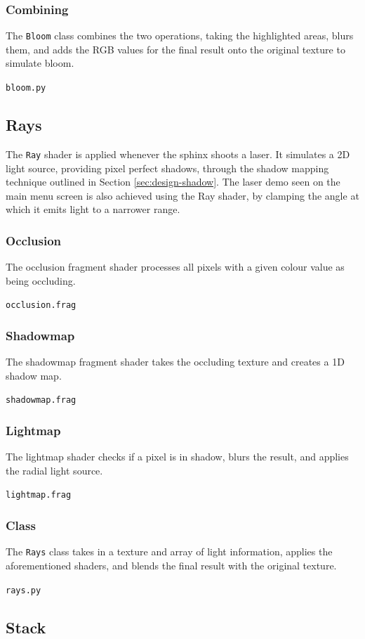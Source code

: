 \documentclass[../main/main.tex]{subfiles}
\begin{document}
\subsubsection*{Combining}
The \lstinline{Bloom} class combines the two operations, taking the highlighted areas, blurs them, and adds the RGB values for the final result onto the original texture to simulate bloom.

\noindent\verb|bloom.py|


\subsection{Rays}
\label{sec:shader-rays}
The \lstinline{Ray} shader is applied whenever the sphinx shoots a laser. It simulates a 2D light source, providing pixel perfect shadows, through the shadow mapping technique outlined in Section \ref{sec:design-shadow}. The laser demo seen on the main menu screen is also achieved using the Ray shader, by clamping the angle at which it emits light to a narrower range.

\subsubsection*{Occlusion}
The occlusion fragment shader processes all pixels with a given colour value as being occluding.

\noindent\verb|occlusion.frag|


\subsubsection*{Shadowmap}
The shadowmap fragment shader takes the occluding texture and creates a 1D shadow map.

\noindent\verb|shadowmap.frag|


\subsubsection*{Lightmap}
The lightmap shader checks if a pixel is in shadow, blurs the result, and applies the radial light source.

\noindent\verb|lightmap.frag|


\subsubsection*{Class}
The \lstinline{Rays} class takes in a texture and array of light information, applies the aforementioned shaders, and blends the final result with the original texture.

\noindent\verb|rays.py|


\subsection{Stack}
\label{sec:stack}
\end{document}
